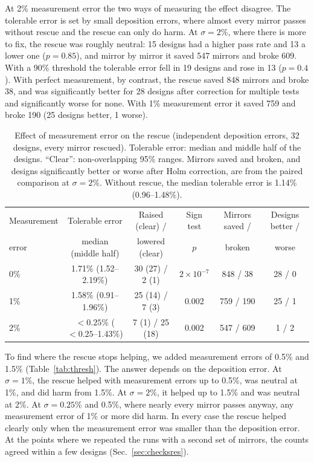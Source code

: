 At 2\% measurement error the two ways of measuring the effect disagree. The tolerable error is set by small deposition errors, where almost every mirror passes without rescue and the rescue can only do harm. At $\sigma = 2\%$, where there is more to fix, the rescue was roughly neutral: 15 designs had a higher pass rate and 13 a lower one ($p = 0.85$), and mirror by mirror it saved 547 mirrors and broke 609. With a 90\% threshold the tolerable error fell in 19 designs and rose in 13 ($p = 0.4$). With perfect measurement, by contrast, the rescue saved 848 mirrors and broke 38, and was significantly better for 28 designs after correction for multiple tests and significantly worse for none. With 1\% measurement error it saved 759 and broke 190 (25 designs better, 1 worse).

\begin{table}[t]
\centering
\caption{Effect of measurement error on the rescue (independent deposition errors, 32 designs, every mirror rescued). Tolerable error: median and middle half of the designs. ``Clear'': non-overlapping 95\% ranges. Mirrors saved and broken, and designs significantly better or worse after Holm correction, are from the paired comparison at $\sigma = 2\%$. Without rescue, the median tolerable error is 1.14\% (0.96--1.48\%).}
\label{tab:meas}
\footnotesize\setlength{\tabcolsep}{4pt}
\begin{tabular}{lccccc}
\toprule
Measurement & Tolerable error & Raised (clear) / & Sign test & Mirrors saved / & Designs better / \\
error & median (middle half) & lowered (clear) & $p$ & broken & worse \\
\midrule
0\% & 1.71\% (1.52--2.19\%) & 30 (27) / 2 (1) & $2\times10^{-7}$ & 848 / 38 & 28 / 0 \\
1\% & 1.58\% (0.91--1.96\%) & 25 (14) / 7 (3) & 0.002 & 759 / 190 & 25 / 1 \\
2\% & $<0.25\%$ ($<0.25$--1.43\%) & 7 (1) / 25 (18) & 0.002 & 547 / 609 & 1 / 2 \\
\bottomrule
\end{tabular}
\end{table}

To find where the rescue stops helping, we added measurement errors of 0.5\% and 1.5\% (Table~\ref{tab:thresh}). The answer depends on the deposition error. At $\sigma = 1\%$, the rescue helped with measurement errors up to 0.5\%, was neutral at 1\%, and did harm from 1.5\%. At $\sigma = 2\%$, it helped up to 1.5\% and was neutral at 2\%. At $\sigma = 0.25\%$ and 0.5\%, where nearly every mirror passes anyway, any measurement error of 1\% or more did harm. In every case the rescue helped clearly only when the measurement error was smaller than the deposition error. At the points where we repeated the runs with a second set of mirrors, the counts agreed within a few designs (Sec.~\ref{sec:checksres}).

